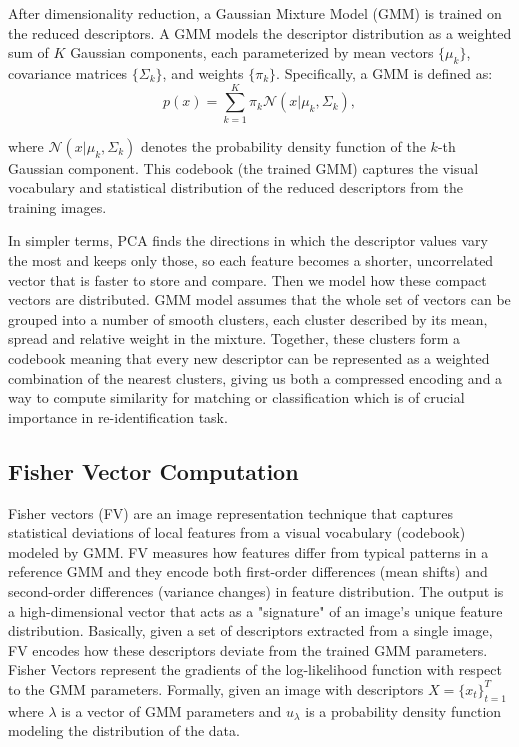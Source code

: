After dimensionality reduction, a Gaussian Mixture Model (GMM) is trained on the reduced descriptors. A GMM models the descriptor distribution as a weighted sum of $K$ Gaussian components, each parameterized by mean vectors $\{\mu_k\}$, covariance matrices $\{\Sigma_k\}$, and weights $\{\pi_k\}$. Specifically, a GMM is defined as:
\begin{equation}
    p(x) = \sum_{k=1}^{K}\pi_k \mathcal{N}(x|\mu_k,\Sigma_k),
\end{equation}

where $\mathcal{N}(x|\mu_k,\Sigma_k)$ denotes the probability density function of the $k$-th Gaussian component. This codebook (the trained GMM) captures the visual vocabulary and statistical distribution of the reduced descriptors from the training images.\cite{springerSpeciesAgnosticPatterned}

In simpler terms, PCA finds the directions in which the descriptor values vary the most and keeps only those, so each feature becomes a shorter, uncorrelated vector that is faster to store and compare. Then we model how these compact vectors are distributed. GMM model assumes that the whole set of vectors can be grouped into a number of smooth clusters, each cluster described by its mean, spread and relative weight in the mixture. Together, these clusters form a codebook meaning that every new descriptor can be represented as a weighted combination of the nearest clusters, giving us both a compressed encoding and a way to compute similarity for matching or classification which is of crucial importance in re-identification task. 

\subsection{Fisher Vector Computation}
\label{sec:fisher_vector_computation}
Fisher vectors (FV) are an image representation technique that captures statistical deviations of local features from a visual vocabulary (codebook) modeled by GMM. FV measures how features differ from typical patterns in a reference GMM and they encode both first-order differences (mean shifts) and second-order differences (variance changes) in feature distribution. The output is a high-dimensional vector that acts as a "signature" of an image's unique feature distribution. Basically, given a set of descriptors extracted from a single image, FV encodes how these descriptors deviate from the trained GMM parameters. Fisher Vectors represent the gradients of the log-likelihood function with respect to the GMM parameters. Formally, given an image with descriptors $X = \{x_t\}_{t=1}^{T}$ where $\lambda$ is a vector of GMM parameters and $u_\lambda$ is a probability density function modeling the distribution of the data. 

